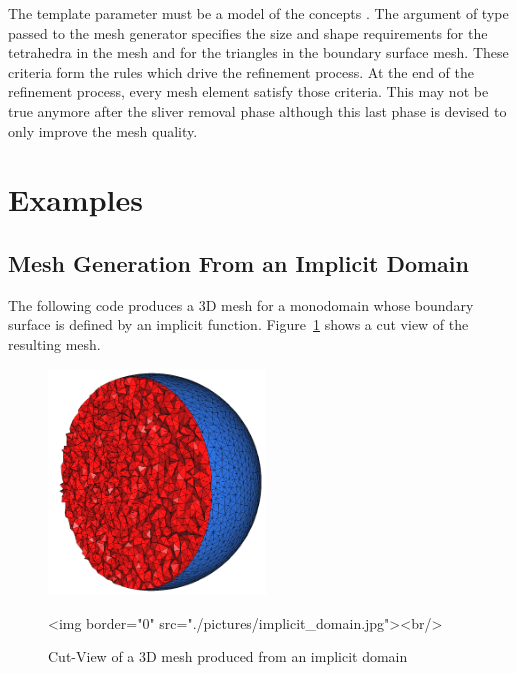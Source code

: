 
The template parameter  must be a model of the concepts
. 
The argument of
type  passed to the mesh generator specifies the
size and shape requirements for the tetrahedra in the mesh
and for the triangles in the boundary surface mesh. These criteria
form the rules which drive the refinement process.  At the end 
of the refinement process, every mesh element satisfy those criteria.
This may not be true anymore after the sliver removal phase although this
last phase is devised to only improve the mesh quality.




\section{Examples}
\label{Mesh_3_section_examples}


\subsection{Mesh Generation From an Implicit Domain}
The following code produces a 3D mesh for a monodomain whose boundary surface
is defined by an implicit
function. Figure~\ref{figure:implicit_domain} shows a cut view of the
resulting mesh.


\begin{figure}[ht]
\begin{center}
 \begin{ccTexOnly}
   \includegraphics[height=6cm]{Mesh_3/pictures/implicit_domain}
 \end{ccTexOnly}
 \begin{ccHtmlOnly}
   <img border="0" src="./pictures/implicit_domain.jpg"><br/>
 \end{ccHtmlOnly}
 \caption{Cut-View of a 3D mesh produced from an implicit domain}
  \label{figure:implicit_domain}
\end{center}
\end{figure}


